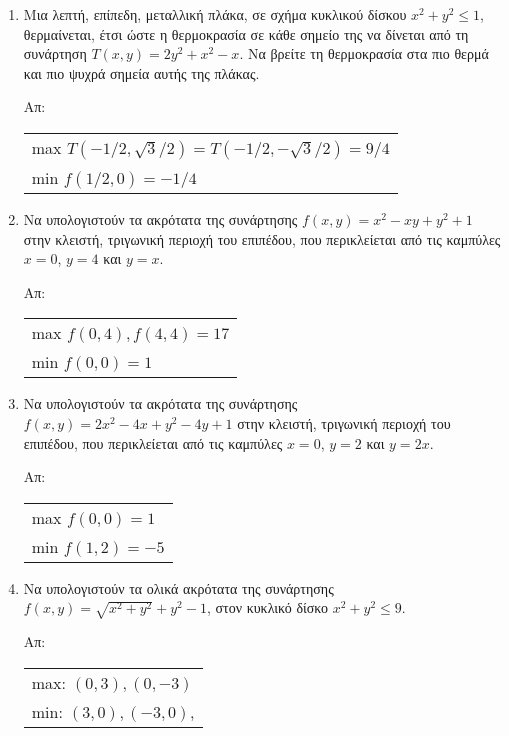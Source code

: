 \documentclass[a4paper,table]{report}
\begin{document}
\begin{enumerate}
  \item Μια λεπτή, επίπεδη, μεταλλική πλάκα, σε σχήμα κυκλικού δίσκου 
    $ x^{2}+y^2 \leq 1 $, θερμαίνεται, έτσι ώστε η θερμοκρασία σε κάθε σημείο της να 
    δίνεται από τη συνάρτηση 
    $ T(x,y) = 2y^{2}+x^{2}-x $.
    Να βρείτε τη θερμοκρασία στα πιο θερμά και πιο ψυχρά σημεία αυτής της πλάκας.

   \hfill Απ:  
    \begin{tabular}{l}
      max $ T(-1/2, \sqrt{3} /2) = T(-1/2, - \sqrt{3} /2) = 9/4 $ \\
      min $ f(1/2,0) = -1/4 $ 
    \end{tabular}

  \item Να υπολογιστούν τα ακρότατα της συνάρτησης $ f(x,y) = x^{2}-xy+y^{2}+1 $ 
    στην κλειστή, τριγωνική περιοχή του επιπέδου, που περικλείεται από τις καμπύλες 
    $ x=0 $, $ y=4 $ και $ y=x $.

    \hfill Απ:  
    \begin{tabular}{l}
      max $ f(0,4), f(4,4) = 17 $ \\
      min $ f(0,0) = 1 $ 
    \end{tabular}

  \item Να υπολογιστούν τα ακρότατα της συνάρτησης $ f(x,y) = 2x^{2}-4x+y^{2}-4y+1 $ 
    στην κλειστή, τριγωνική περιοχή του επιπέδου, που περικλείεται από τις καμπύλες 
    $ x=0 $, $ y=2 $ και $ y=2x $.

    \hfill Απ:  
    \begin{tabular}{l}
      max $ f(0,0) = 1 $ \\
      min $ f(1,2) = -5 $ 
    \end{tabular}

  \item Να υπολογιστούν τα ολικά ακρότατα της συνάρτησης $ f(x,y) = \sqrt{x^{2}+y^{2}} +
    y^{2}-1 $, στον κυκλικό δίσκο $ x^{2}+y^{2} \leq 9 $. 

    \hfill Απ: 
    \begin{tabular}{l}
      max: $ (0,3), (0,-3) $ \\
      min: $ (3,0), (-3,0) $, 
    \end{tabular}

\end{enumerate}
\end{document}
